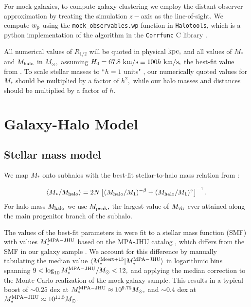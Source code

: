 \documentclass[usenatbib,usegraphicx,letterpaper]{mn2e}
\newcommand{\rhalf}{R_{1/2}}
\newcommand{\mstar}{M_{\ast}}
\newcommand{\mvir}{M_{\rm vir}}
\newcommand{\mpeak}{M_{\rm peak}}
\newcommand{\mhalo}{M_{\rm halo}}
\newcommand{\wproj}{w_{\rm p}}
\newcommand{\kpc}{{\rm kpc}}
\newcommand{\msun}{M_\odot}
\newcommand{\kms}{{\rm km/s}}
\begin{document}
For mock galaxies, to compute galaxy clustering we employ the distant observer approximation by treating the simulation $z-$axis as the line-of-sight. We compute $\wproj$ using the {\tt mock\_observables.wp} function in {\tt Halotools}, which is a python implementation of the algorithm in the {\tt Corrfunc} C library \citep{sinha_etal17}. 

All numerical values of $\rhalf$ will be quoted in physical $\kpc,$ and all values of $\mstar$ and $\mhalo$ in $\msun,$ assuming $H_0=67.8~\kms\equiv100h~\kms,$ the best-fit value from \citet{planck15}. To scale stellar masses to ``$h=1$ units" \citep{croton13}, our numerically quoted values for $\mstar$ should be multiplied by a factor of $h^2,$ while our halo masses and distances should be multiplied by a factor of $h.$


\section{Galaxy-Halo Model}
\label{sec:model}

\subsection{Stellar mass model}
\label{subsec:smhm}

We map $\mstar$ onto subhalos with the best-fit stellar-to-halo mass relation from \citet{moster_etal13}:

\begin{equation}
\label{eq:smhm}
\langle\mstar/\mhalo\rangle = 2N\left[(\mhalo/M_{1})^{-\beta} + (\mhalo/M_1)^{\gamma}\right]^{-1}.
\end{equation}
For halo mass $\mhalo$ we use $\mpeak,$ the largest value of $\mvir$ ever attained along the main progenitor branch of the subhalo. 

The values of the best-fit parameters in \citet{moster_etal13} were fit to a stellar mass function (SMF) with values $\mstar^{\rm MPA-JHU}$ based on the MPA-JHU catalog \citep{kauffmann_etal03,brinchmann_etal04}, which differs from the SMF in our galaxy sample \citep[see, e.g.,][]{bernardi_etal14}. We account for this difference by manually tabulating the median value $\langle\mstar^{\rm Meert+15}\vert\mstar^{\rm MPA-JHU}\rangle$ in logarithmic bins spanning $9 < \log_{10}\mstar^{\rm MPA-JHU}/\msun < 12,$ and applying the median correction to the Monte Carlo realization of the mock galaxy sample. This results in a typical boost of $\sim0.25$ dex at $\mstar^{\rm MPA-JHU}\approx10^{9.75}\msun,$ and $\sim0.4$ dex at $\mstar^{\rm MPA-JHU}\approx10^{11.5}\msun.$ 
\end{document}
